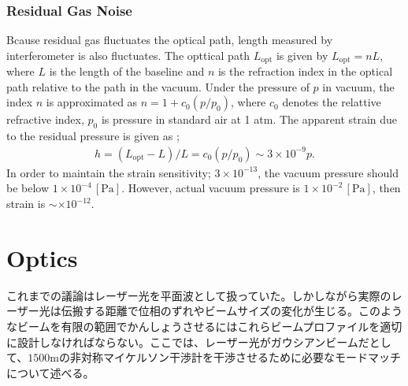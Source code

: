 \subsubsection{Residual Gas Noise}
Bcause residual gas fluctuates the optical path, length measured by interferometer is also fluctuates. The opttical path $L_{\mathrm{opt}}$ is given by $L_{\mathrm{opt}}=nL$, where $L$ is the length of the baseline and $n$ is the refraction index in the optical path relative to the path in the vacuum. Under the pressure of $p$ in vacuum, the index $n$ is approximated as $n = 1 + c_0(p/p_0)$, where $c_0$ denotes the relattive refractive index, $p_0$ is pressure in standard air at 1 atm. The apparent strain due to the residual pressure is given as \cite{ciddor1996refractive};
\begin{eqnarray}
  h = (L_{\mathrm{opt}}-L)/L = c_0(p/p_0) \sim 3\times10^{-9} p.
\end{eqnarray}
In order to maintain the strain sensitivity; $3\times10^{-13}$, the vacuum pressure should be below $1\times10^{-4}\,[\mathrm{Pa}]$. However, actual vacuum pressure is $1\times10^{-2}\,[\mathrm{Pa}]$, then strain is $\sim\times10^{-12}$.



\section{Optics} \label{sec:sec43} %
これまでの議論はレーザー光を平面波として扱っていた。しかしながら実際のレーザー光は伝搬する距離で位相のずれやビームサイズの変化が生じる。このようなビームを有限の範囲でかんしょうさせるにはこれらビームプロファイルを適切に設計しなければならない。ここでは、レーザー光がガウシアンビームだとして、$1500\mathrm{m}$の非対称マイケルソン干渉計を干渉させるために必要なモードマッチについて述べる。

